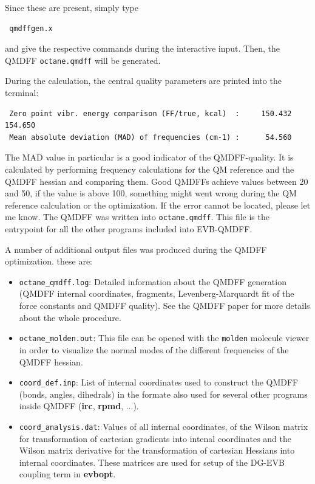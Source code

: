 \documentclass[12pt,a4paper]{scrartcl}
\begin{document}
Since these are present, simply type 

\begin{verbatim}
 qmdffgen.x
\end{verbatim}


and give the respective commands during the interactive input.
Then, the QMDFF \texttt{octane.qmdff} will be generated.

During the calculation, the central quality parameters are printed into the terminal:

\begin{verbatim}
 Zero point vibr. energy comparison (FF/true, kcal)  :     150.432     154.650
 Mean absolute deviation (MAD) of frequencies (cm-1) :      54.560
\end{verbatim}

The MAD value in particular is a good indicator of the QMDFF-quality. It is calculated by 
performing frequency calculations for the QM reference and the QMDFF hessian and comparing 
them. Good QMDFFs achieve values between 20 and 50, if the value is above 100, something 
might went wrong during the QM reference calculation or the optimization.
If the error cannot be located, please let me know.
The QMDFF was written into \texttt{octane.qmdff}. This file is the entrypoint for 
all the other programs included into EVB-QMDFF.

A number of additional output files was produced during the QMDFF optimization.
these are:

\begin{itemize}
 \item \texttt{octane\_qmdff.log}: Detailed information about the QMDFF generation (QMDFF internal
      coordinates, fragments, Levenberg-Marquardt fit of the force constants and QMDFF quality).
      See the QMDFF paper \cite{qmdff} for more details about the whole procedure.
 \item \texttt{octane\_molden.out}: This file can be opened with the \texttt{molden} molecule 
      viewer in order to visualize the normal modes of the different frequencies of the 
      QMDFF hessian.
 \item \texttt{coord\_def.inp}: List of internal coordinates used to construct the QMDFF (bonds, 
      angles, dihedrals) in the formate also used for several other programs inside QMDFF
      (\textbf{irc}, \textbf{rpmd}, ...).
 \item \texttt{coord\_analysis.dat}: Values of all internal coordinates, of the Wilson matrix for 
      transformation of cartesian gradients into intenal coordinates and the Wilson matrix 
      derivative for the transformation of cartesian Hessians into internal coordinates. 
      These matrices are used for setup of the DG-EVB coupling term in \textbf{evbopt}.
\end{itemize}
\end{document}

